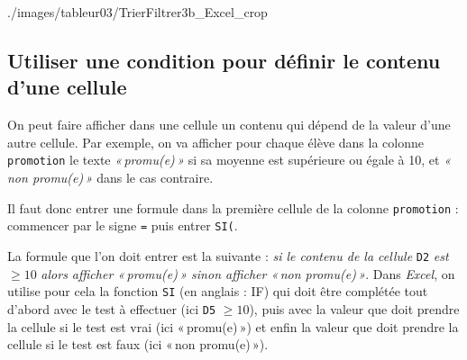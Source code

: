 %
{./images/tableur03/TrierFiltrer3b_Excel_crop}{\textwidth}













\subsection{Utiliser une condition pour définir le contenu d'une cellule}\label{Calc3Condition}

On peut faire afficher dans une cellule un contenu qui dépend de la valeur d'une autre cellule. Par exemple, on va afficher pour chaque élève dans la colonne \texttt{promotion} le texte \emph{«\,promu(e)\,»} si sa moyenne est supérieure ou égale à 10, et \emph{«\,non promu(e)\,»} dans le cas contraire.

Il faut donc entrer une formule dans la première cellule de la colonne \texttt{promotion} : commencer par le signe \texttt{=} puis entrer \texttt{SI(}.


La formule que l'on doit entrer est la suivante : \textsl{si le contenu de la cellule} \texttt{D2} \textsl{est} $\geqslant 10$ \textsl{alors afficher «\,promu(e)\,» sinon afficher «\,non promu(e)\,»}. Dans \emph{Excel}, on utilise pour cela la fonction \texttt{SI} (en anglais : IF) qui doit être complétée tout d'abord avec le test à effectuer (ici \texttt{D5} $\geqslant 10$), puis avec la valeur que doit prendre la cellule si le test est vrai (ici «\,promu(e)\,») et enfin la valeur que doit prendre la cellule si le test est faux (ici «\,non promu(e)\,»).

\vspace{1em}


